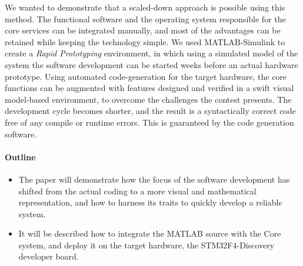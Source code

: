 
We wanted to demonstrate that a scaled-down approach is possible using this method. The functional software and the operating system responsible for the core services can be integrated manually, and most of the advantages can be retained while keeping the technology simple. We used \textsf{MATLAB-Simulink} to create a \emph{Rapid Prototyping} environment, in which using a simulated model of the system the software development can be started weeks before an actual hardware prototype. Using automated code-generation for the target hardware, the core functions can be augmented with features designed and verified in a swift visual model-based environment, to overcome the challenges the contest presents. The development cycle becomes shorter, and the result is a syntactically correct code free of any compile or runtime errors. This is guaranteed by the code generation software.

\paragraph{Outline}
\begin{itemize}
\item The paper will demonstrate how the focus of the software development has shifted from the actual coding to a more visual and mathematical representation, and how to harness its traits to quickly develop a reliable system.
\item It will be described how to integrate the \textsf{MATLAB} source with the Core system, and deploy it on the target hardware, the \textsf{STM32F4-Discovery} developer board.
\end{itemize}